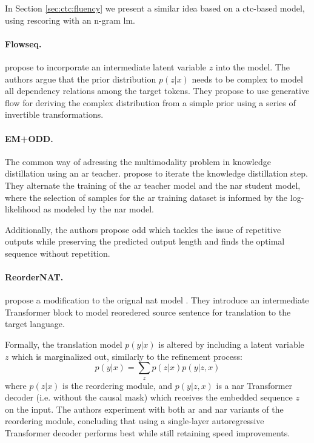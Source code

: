 In Section \ref{sec:ctc:fluency} we present a similar idea based on a
\ac{ctc}-based model, using rescoring with an n-gram \acl{lm}.

\paragraph{Flowseq.} %
\citet{ma-etal-2019-flowseq} propose to incorporate an intermediate latent
variable $z$ into the model. The authors argue that the prior distribution
$p(z|x)$ needs to be complex to model all dependency relations among the target
tokens. They propose to use generative flow \citep{rezende2015variational} for
deriving the complex distribution from a simple prior using a series of
invertible transformations.

\paragraph{EM+ODD.} %
The common way of adressing the multimodality problem in knowledge distillation
using an \acl{ar} teacher. \citet{sun2020em} propose to iterate the knowledge
distillation step. They alternate the training of the \ac{ar} teacher model and
the \ac{nar} student model, where the selection of samples for the \ac{ar}
training dataset is informed by the log-likelihood as modeled by the \ac{nar}
model.

Additionally, the authors propose \acf{odd} which tackles the issue of
repetitive outputs while preserving the predicted output length and finds the
optimal sequence without repetition.

\paragraph{ReorderNAT.} \citet{ran-etal-2021-guiding} propose a modification to
the orignal \ac{nat} model \citep{gu2017nonautoregressive}. They introduce an
intermediate Transformer block to model reoredered source sentence for
translation to the target language.

Formally, the translation model $p(y|x)$ is altered by including a latent
variable $z$ which is marginalized out, similarly to the refinement process:
%
\begin{equation}
  p(y|x) = \sum_{z} p(z|x) p(y|z,x)
\end{equation}
%
where $p(z|x)$ is the reordering module, and $p(y|z,x)$ is a \ac{nar}
Transformer decoder (i.e. without the causal mask) which receives the embedded
sequence $z$ on the input. The authors experiment with both \ac{ar} and
\ac{nar} variants of the reordering module, concluding that using a
single-layer autoregressive Transformer decoder performs best while still
retaining speed improvements.

